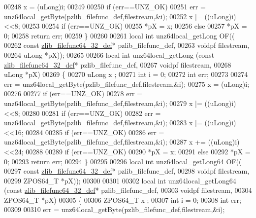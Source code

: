 \begin{DoxyCode}
00248     x = (uLong)i;
00249 
00250     \textcolor{keywordflow}{if} (err==UNZ\_OK)
00251         err = unz64local\_getByte(pzlib\_filefunc\_def,filestream,&i);
00252     x |= ((uLong)i)<<8;
00253 
00254     \textcolor{keywordflow}{if} (err==UNZ\_OK)
00255         *pX = x;
00256     \textcolor{keywordflow}{else}
00257         *pX = 0;
00258     \textcolor{keywordflow}{return} err;
00259 \}
00260 
00261 local \textcolor{keywordtype}{int} unz64local\_getLong OF((
00262     \textcolor{keyword}{const} \hyperlink{structzlib__filefunc64__32__def__s}{zlib\_filefunc64\_32\_def}* pzlib\_filefunc\_def,
00263     voidpf filestream,
00264     uLong *pX));
00265 
00266 local \textcolor{keywordtype}{int} unz64local\_getLong (\textcolor{keyword}{const} \hyperlink{structzlib__filefunc64__32__def__s}{zlib\_filefunc64\_32\_def}* pzlib\_filefunc\_def,
00267                             voidpf filestream,
00268                             uLong *pX)
00269 \{
00270     uLong x ;
00271     \textcolor{keywordtype}{int} i = 0;
00272     \textcolor{keywordtype}{int} err;
00273 
00274     err = unz64local\_getByte(pzlib\_filefunc\_def,filestream,&i);
00275     x = (uLong)i;
00276 
00277     \textcolor{keywordflow}{if} (err==UNZ\_OK)
00278         err = unz64local\_getByte(pzlib\_filefunc\_def,filestream,&i);
00279     x |= ((uLong)i)<<8;
00280 
00281     \textcolor{keywordflow}{if} (err==UNZ\_OK)
00282         err = unz64local\_getByte(pzlib\_filefunc\_def,filestream,&i);
00283     x |= ((uLong)i)<<16;
00284 
00285     \textcolor{keywordflow}{if} (err==UNZ\_OK)
00286         err = unz64local\_getByte(pzlib\_filefunc\_def,filestream,&i);
00287     x += ((uLong)i)<<24;
00288 
00289     \textcolor{keywordflow}{if} (err==UNZ\_OK)
00290         *pX = x;
00291     \textcolor{keywordflow}{else}
00292         *pX = 0;
00293     \textcolor{keywordflow}{return} err;
00294 \}
00295 
00296 local \textcolor{keywordtype}{int} unz64local\_getLong64 OF((
00297     \textcolor{keyword}{const} \hyperlink{structzlib__filefunc64__32__def__s}{zlib\_filefunc64\_32\_def}* pzlib\_filefunc\_def,
00298     voidpf filestream,
00299     ZPOS64\_T *pX));
00300 
00301 
00302 local \textcolor{keywordtype}{int} unz64local\_getLong64 (\textcolor{keyword}{const} \hyperlink{structzlib__filefunc64__32__def__s}{zlib\_filefunc64\_32\_def}* pzlib\_filefunc\_def,
00303                             voidpf filestream,
00304                             ZPOS64\_T *pX)
00305 \{
00306     ZPOS64\_T x ;
00307     \textcolor{keywordtype}{int} i = 0;
00308     \textcolor{keywordtype}{int} err;
00309 
00310     err = unz64local\_getByte(pzlib\_filefunc\_def,filestream,&i);

\end{DoxyCode}
